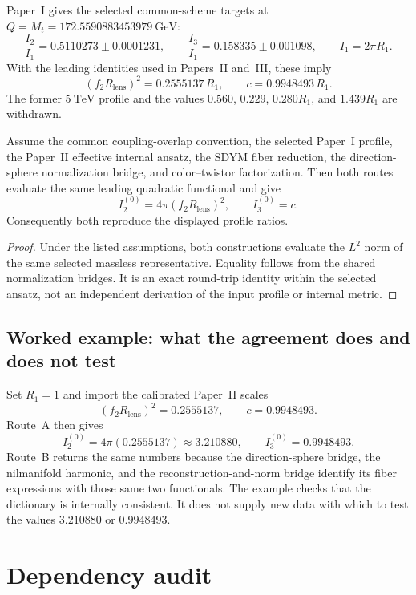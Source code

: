 \documentclass[11pt]{article}
\begin{document}
Paper~I gives the selected common-scheme targets at
$Q=M_t=172.5590883453979~\mathrm{GeV}$:
\[
\frac{I_2}{I_1}=0.5110273\pm0.0001231,
\qquad
\frac{I_3}{I_1}=0.158335\pm0.001098,
\qquad
I_1=2\pi R_1.
\]
With the leading identities used in Papers~II and~III, these imply
\[
(f_2R_{\mathrm{lens}})^2=0.2555137\,R_1,
\qquad
c=0.9948493\,R_1.
\]
The former $5~\mathrm{TeV}$ profile and the values $0.560$, $0.229$,
$0.280R_1$, and $1.439R_1$ are withdrawn.

\begin{theorem}
Assume the common coupling-overlap convention, the selected Paper~I profile,
the Paper~II effective internal ansatz, the SDYM fiber reduction, the
direction-sphere normalization bridge, and color--twistor factorization. Then
both routes evaluate the same leading quadratic functional and give
\[
I_2^{(0)}=4\pi(f_2R_{\mathrm{lens}})^2,
\qquad
I_3^{(0)}=c.
\]
Consequently both reproduce the displayed profile ratios.
\end{theorem}

\begin{proof}
Under the listed assumptions, both constructions evaluate the $L^2$ norm of
the same selected massless representative. Equality follows from the shared
normalization bridges. It is an exact round-trip identity within the selected
ansatz, not an independent derivation of the input profile or internal metric.
\end{proof}

\subsection{Worked example: what the agreement does and does not test}

Set $R_1=1$ and import the calibrated Paper~II scales
\[
(f_2R_{\mathrm{lens}})^2=0.2555137,
\qquad
c=0.9948493.
\]
Route~A then gives
\[
I_2^{(0)}=4\pi(0.2555137)\approx3.210880,
\qquad
I_3^{(0)}=0.9948493.
\]
Route~B returns the same numbers because the direction-sphere bridge, the
nilmanifold harmonic, and the reconstruction-and-norm bridge identify its
fiber expressions with those same two functionals. The example checks that the
dictionary is internally consistent. It does not supply new data with which to
test the values $3.210880$ or $0.9948493$.

\section{Dependency audit}
\end{document}
